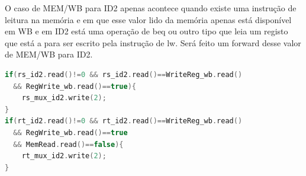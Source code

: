 \documentclass[pdftex,12pt,a4paper]{report}
\begin{document}
\begin{table}[!htb]
\centering
\label{my-label}
\end{table}

O caso de MEM/WB para ID2 apenas acontece quando existe uma instrução de leitura na memória e em que esse valor lido da memória apenas está disponível em WB e em ID2 está uma operação de beq ou outro tipo que leia um registo que está a para ser escrito pela instrução de lw. Será feito um forward desse valor de MEM/WB para ID2.

\begin{lstlisting}[language=c]
if(rs_id2.read()!=0 && rs_id2.read()==WriteReg_wb.read()
  && RegWrite_wb.read()==true){
    rs_mux_id2.write(2);
}
if(rt_id2.read()!=0 && rt_id2.read()==WriteReg_wb.read() 
  && RegWrite_wb.read()==true 
  && MemRead.read()==false){
    rt_mux_id2.write(2);
}
\end{lstlisting} 
\end{document}
